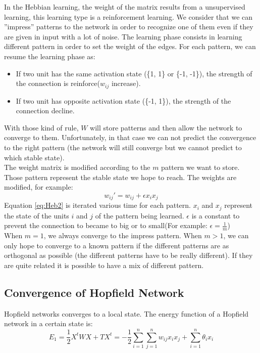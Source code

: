   In the Hebbian learning, the weight of the matrix results from a unsupervised learning, this learning type is a reinforcement learning. We consider that we can ”impress” patterns to the network in order to recognize one of them even if they are given in input with a lot of noise. The learning phase consists in learning different pattern in order to set the weight of the edges. For each pattern, we can resume the learning phase as:
  \begin{itemize}
    \item If two unit has the same activation state (\{1, 1\} or \{-1, -1\}), the strength of the connection is reinforce($w_{ij}$ increase).
    \item If two unit has opposite activation state (\{-1, 1\}), the strength of the connection decline.
  \end{itemize}
  With those kind of rule, $W$ will store patterns and then allow the network to converge to them. Unfortunately, in that case we can not predict the convergence to the right pattern (the network will still converge but we cannot predict to which stable state). \\

  The weight matrix is modified according to the $m$ pattern we want to store. Those pattern represent the stable state we hope to reach. The weights are modified, for example:
  \begin{equation}
  \label{eq:Heb2}
  w_{ij}' = w_{ij} + \epsilon x_i x_j
  \end{equation}
  Equation \ref{eq:Heb2} is iterated various time for each pattern. $x_i$ and $x_j$ represent the state of the units $i$ and $j$ of the pattern being learned. $\epsilon$ is a constant to prevent the connection to became to big or to small(For example: $\epsilon = \frac{1}{m}$)\\

  When $m = 1$, we always converge to the impress pattern. When $m > 1$, we can only hope to converge to a known pattern if the different patterns are as orthogonal as possible (the different patterns have to be really different). If they are quite related it is possible to have a mix of different pattern.

\subsection{Convergence of Hopfield Network}
Hopfield networks converges to a local state. The energy function of a Hopfield network in a certain state is:
\begin{equation}
\label{eq:energy1}
E_1 = \frac{1}{2}X^tWX + TX^t = - \frac{1}{2}\sum_{i = 1}^{n}\sum_{j = 1}^{n}w_{ij} x_i x_j + \sum_{i = 1}^n \theta_i x_i
\end{equation}

